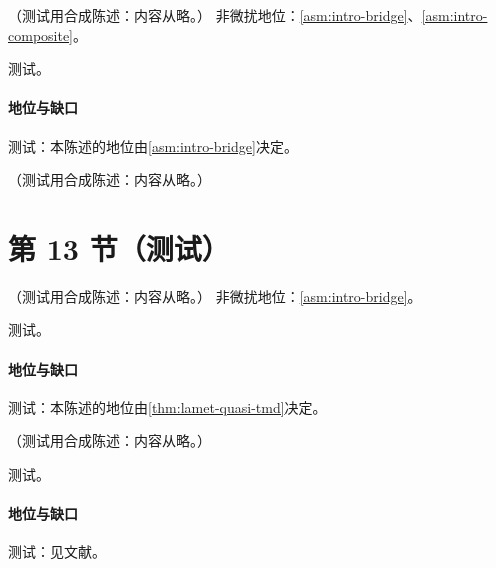 \begin{theorem}\label{thm:lamet-quasi-tmd}
（测试用合成陈述：内容从略。）
非微扰地位：\cref{asm:intro-bridge}、\cref{asm:intro-composite}。
\end{theorem}
\begin{proofsketch}测试。\end{proofsketch}
\paragraph{地位与缺口}测试：本陈述的地位由\cref{asm:intro-bridge}决定。

\begin{example}\label{ex:lamet-qtmd-oneloop}
（测试用合成陈述：内容从略。）
\end{example}

\section{第 13 节（测试）}\label{sec:lattice-tmd}

\begin{proposition}\label{prop:lattice-cs-kernel}
（测试用合成陈述：内容从略。）
非微扰地位：\cref{asm:intro-bridge}。
\end{proposition}
\begin{proofsketch}测试。\end{proofsketch}
\paragraph{地位与缺口}测试：本陈述的地位由\cref{thm:lamet-quasi-tmd}决定。

\begin{proposition}\label{prop:lamet-tmd-ratios}
（测试用合成陈述：内容从略。）
\end{proposition}
\begin{proofsketch}测试。\end{proofsketch}
\paragraph{地位与缺口}测试：见文献。

